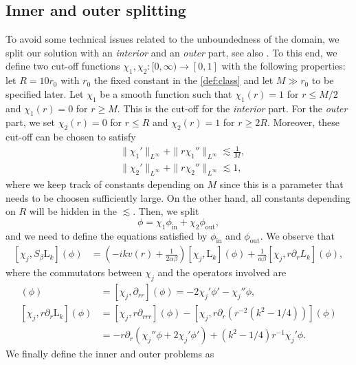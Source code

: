 \documentclass[11pt,reqno]{amsproc}
\def\de{{\partial}}
\newcommand{\rmin}{\mathrm{in}}
\newcommand{\rmout}{\mathrm{out}}
\newcommand{\rmL}{\mathrm{L}}
\theoremstyle{definition}
\theoremstyle{definition}
\numberwithin{equation}{section}
\begin{document}
\subsection{Inner and outer splitting}
\label{sec:inout}
To avoid some technical issues related to the unboundedness of the domain, we split our solution with an \textit{interior} and an \textit{outer} part, see also \cite{albritton2023linear,kumar2023simple}. To this end, we define two cut-off functions $\chi_1,\chi_2:[0,\infty)\to [0,1]$ with the following properties: let $R=10r_0$ with $r_0$ the fixed constant  in the \cref{def:class} and let $M\gg r_0$ to be specified later.
Let $\chi_1$ be a smooth function such that $\chi_1(r)=1$ for $r\leq M/2$ and $\chi_1(r)=0$ for $r\geq M$. This is the cut-off for the \textit{interior} part. For the \textit{outer} part, we set $\chi_2(r)=0$ for $r\leq R$ and $\chi_2(r)=1$ for $r\geq 2R$. Moreover, these cut-off can be chosen to satisfy
\begin{align}
&\|\chi_1'\|_{L^\infty}+\|r\chi_1''\|_{L^\infty}\lesssim \frac{1}{M},\label{eq:boundschi1}\\
&\|\chi_2'\|_{L^\infty}+\|r\chi_2''\|_{L^\infty}\lesssim 1,\label{eq:boundschi2}
\end{align}
where we keep track of constants depending on $M$ since this is a parameter that needs to be choosen sufficiently large. On the other hand, all constants depending on $R$ will be hidden in the $\lesssim$.
Then, we split 
\begin{equation}
      \phi= \chi_1\phi_{\rmin}+\chi_2\phi_{\rmout},
\end{equation}
and we need to  define the equations satisfied by $\phi_{\rmin}$ and $\phi_{\rmout}$. We observe that 
\begin{align}
\label{com:chiL}
[\chi_j,S_\beta \rmL_k](\phi)&=\left(-ikv(r)+\frac{1}{2\alpha\beta}\right)[\chi_j,\rmL_k](\phi)+\frac{1}{\alpha\beta}[\chi_j,r\de_rL_k](\phi),
\end{align} 
where  the commutators between $\chi_j$ and the operators involved are
\begin{align}
[\chi_j,\rmL_k](\phi)& =[\chi_j,\de_{rr}](\phi)=-2\chi_j'\phi'-\chi_j''\phi, \\
    \label{com:chirL}[\chi_j,r\de_r\rmL_k](\phi)& =[\chi_j,r\de_{rrr}](\phi)  - [\chi_j,r\de_{r} (r^{-2}(k^2-1/4))](\phi) \nonumber\\
    & =-r\de_r(\chi_j''\phi+2\chi_j'\phi')+ (k^2-1/4) r^{-1} \chi_j'\phi.
\end{align}
We finally define the inner and outer problems as 
\end{document}
